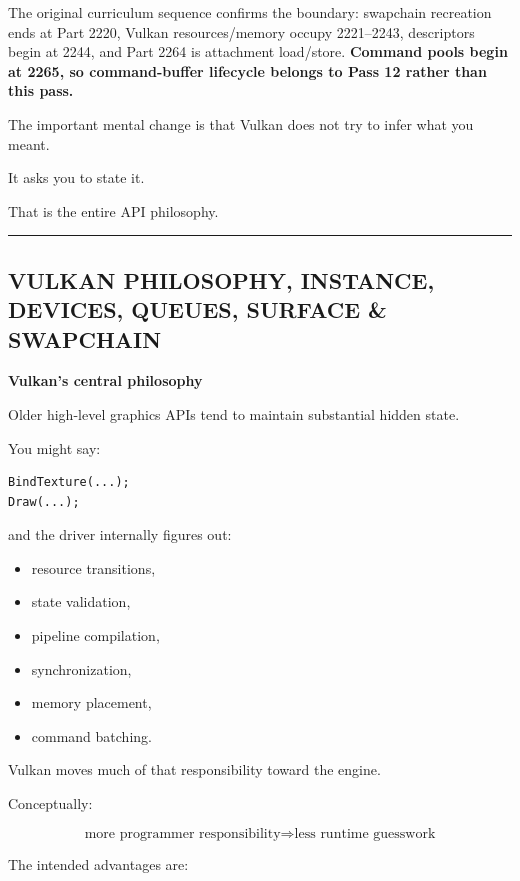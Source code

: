 The original curriculum sequence confirms the boundary: swapchain recreation ends at Part 2220, Vulkan resources/memory occupy 2221--2243, descriptors begin at 2244, and Part 2264 is attachment load/store. \textbf{Command pools begin at 2265, so command-buffer lifecycle belongs to Pass 12 rather than this pass.}

The important mental change is that Vulkan does not try to infer what you meant.

It asks you to state it.

That is the entire API philosophy.

\begin{center}\rule{0.5\linewidth}{0.5pt}\end{center}

\subsection{VULKAN PHILOSOPHY, INSTANCE, DEVICES, QUEUES, SURFACE \& SWAPCHAIN}\label{05-engine-i-ch020-vulkan-philosophy-instance-devices-queues-surface-swapchain}

\textbf{Vulkan's central philosophy}

Older high-level graphics APIs tend to maintain substantial hidden state.

You might say:

\begin{verbatim}
BindTexture(...);
Draw(...);
\end{verbatim}

and the driver internally figures out:

\begin{itemize}
\tightlist
\item
  resource transitions,
\item
  state validation,
\item
  pipeline compilation,
\item
  synchronization,
\item
  memory placement,
\item
  command batching.
\end{itemize}

Vulkan moves much of that responsibility toward the engine.

Conceptually:

\[
\boxed{
\text{more programmer responsibility}
\Longrightarrow
\text{less runtime guesswork}
}
\]

The intended advantages are:

